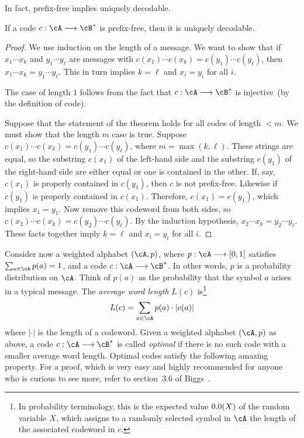 In fact, prefix-free implies uniquely decodable.

\begin{theorem}
If a code $c: \cA \to \cB^*$ is prefix-free, then it is uniquely
decodable.
\end{theorem}

\begin{proof}
We use induction on the length of a message. We want
to show that if $x_1 \cdots x_k$ and $y_1 \cdots y_\ell$ are messages
with $c(x_1) \cdots c(x_k) = c(y_1) \cdots c(y_\ell)$, then
$x_1 \cdots x_k = y_1 \cdots y_\ell$. This in turn implies $k = \ell$
and $x_i = y_i$ for all $i$.

The case of length $1$ follows from the fact that $c: \cA \to \cB^*$
is injective~(by the definition of code).

Suppose that the statement of the theorem holds for all codes of
length $< m$. We must show that the length $m$ case is true. Suppose
$c(x_1) \cdots c(x_k) = c(y_1) \cdots c(y_\ell)$, where
$m = \max(k, \ell)$. These strings are equal, so the substring
$c(x_1)$ of the left-hand side and the substring $c(y_1)$ of the
right-hand side are either equal or one is contained in the other. If,
say, $c(x_1)$ is properly contained in $c(y_1)$, then $c$ is not
prefix-free. Likewise if $c(y_1)$ is properly contained in
$c(x_1)$. Therefore, $c(x_1) = c(y_1)$, which implies $x_1 = y_1$. Now
remove this codeword from both sides, so
$c(x_2) \cdots c(x_k) = c(y_2) \cdots c(y_\ell)$. By the induction
hypothesis, $x_2 \cdots x_k = y_2 \cdots y_\ell$. These facts together
imply $k = \ell$ and $x_i = y_i$ for all $i$.
\end{proof}

Consider now a weighted alphabet $(\cA, p)$, where $p: \cA \to [0,1]$
satisfies $\sum_{a \in \cA} p(a) = 1$, and a code $c: \cA \to \cB^*$.
In other words, $p$ is a probability distribution on $\cA$. Think of
$p(a)$ as the probability that the symbol $a$ arises in a typical
message. The \emph{average word length} $L(c)$ is\footnote{
  In probability terminology, this is the
  expected value $\E(X)$ of the random
  variable $X$, which assigns to a randomly selected symbol in $\cA$
  the length of the associated codeword in $c$.
}
\[
L(c)
=
\sum_{a \in \cA} p(a) \cdot |c(a)|
\]
where $|\cdot|$ is the length of a codeword.
Given a weighted alphabet $(\cA, p)$ as
above, a code $c: \cA \to \cB^*$ is called
\emph{optimal} if there is no such code with a
smaller average word length. Optimal codes satisfy the following
amazing property. For a proof, which is very easy and highly
recommended for anyone who is curious to see more, refer to
section~3.6 of Biggs~\cite{Biggs2009}.

